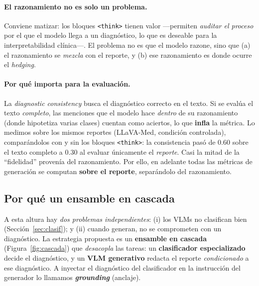 \documentclass[11pt, a4paper]{article}
\begin{document}
\paragraph{El razonamiento no es solo un problema.} Conviene matizar: los bloques \texttt{<think>} tienen
valor —permiten \emph{auditar el proceso} por el que el modelo llega a un diagnóstico, lo que es
deseable para la interpretabilidad clínica—. El problema no es que el modelo razone, sino que (a) el
razonamiento se \emph{mezcla} con el reporte, y (b) ese razonamiento es donde ocurre el \emph{hedging}.

\paragraph{Por qué importa para la evaluación.} La \emph{diagnostic consistency} busca el diagnóstico
correcto en el texto. Si se evalúa el texto \emph{completo}, las menciones que el modelo hace
\emph{dentro} de su razonamiento (donde hipotetiza varias clases) cuentan como aciertos, lo que
\textbf{infla} la métrica. Lo medimos sobre los mismos reportes (LLaVA-Med, condición controlada),
comparándolos con y sin los bloques \texttt{<think>}: la consistencia pasó de $0.60$ sobre el texto
completo a $0.30$ al evaluar únicamente el \emph{reporte}. Casi la mitad de la ``fidelidad'' provenía del
razonamiento. Por ello, en adelante todas las métricas de
generación se computan \textbf{sobre el reporte}, separándolo del razonamiento.

\subsection{Por qué un ensamble en cascada}
\label{sec:porque_ensamble}
A esta altura hay \emph{dos problemas independientes}: (i) los VLMs no clasifican bien
(Sección~\ref{sec:clasif}); y (ii) cuando generan, no se comprometen con un diagnóstico. La estrategia
propuesta es un \textbf{ensamble en cascada} (Figura~\ref{fig:cascada}) que \emph{desacopla} las tareas:
un \textbf{clasificador especializado} decide el diagnóstico, y un \textbf{VLM generativo} redacta el
reporte \emph{condicionado} a ese diagnóstico. A inyectar el diagnóstico del clasificador en la
instrucción del generador lo llamamos \textbf{\emph{grounding}} (anclaje).
\end{document}
